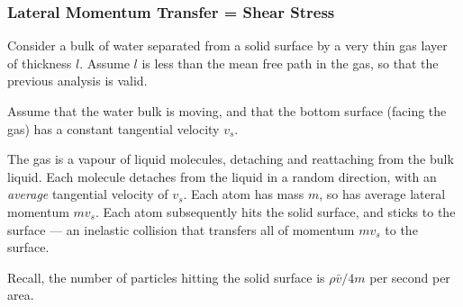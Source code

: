\documentclass{paper}
\begin{document}
\subsubsection*{Lateral Momentum Transfer = Shear Stress}

Consider a bulk of water separated from a solid surface by a very thin gas layer of thickness $l$.  Assume $l$ is less than the mean free path in the gas, so that the previous analysis is valid.

Assume that the water bulk is moving, and that the bottom surface (facing the gas) has a constant tangential velocity $v_{s}$.

The gas is a vapour of liquid molecules, detaching and reattaching from the bulk liquid.  Each molecule detaches from the liquid in a random direction, with an \emph{average} tangential velocity of $v_{s}$.  Each atom has mass $m$, so has average lateral momentum $mv_{s}$. Each atom subsequently hits the solid surface, and sticks to the surface  --- an inelastic collision that transfers all of momentum $mv_{s}$ to the surface. 

\vspace{1em}

\vspace{1em}
Recall, the number of particles hitting the solid surface is $ \rho \bar{v} / 4 m$ per second per area.
\end{document}
